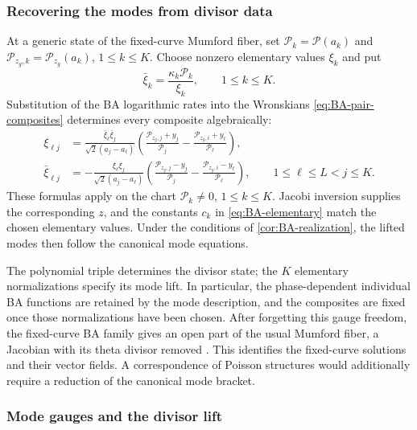 \subsubsection{Recovering the modes from divisor data}

At a generic state of the fixed-curve Mumford fiber, set
$\mathcal P_k=\mathcal P(a_k)$ and
$\mathcal P_{z_g,k}=\mathcal P_{z_g}(a_k)$,
$1\leq k\leq K$. Choose nonzero elementary values $\xi_k$ and put
\begin{equation}\label{eq:mumford-mode-inverse}
 \bar{\xi}_k=\frac{\kappa_k\mathcal P_k}{\xi_k},
 \qquad1\leq k\leq K.
\end{equation}
Substitution of the BA logarithmic rates into the Wronskians
\cref{eq:BA-pair-composites} determines every composite algebraically:
\begin{equation}\label{eq:mumford-composite-inverse}
\begin{aligned}
 \xi_{\ell j}
 &=\frac{\bar{\xi}_{\ell}\bar{\xi}_j}{\sqrt2(a_j-a_{\ell})}
       \left(\frac{\mathcal P_{z_g,j}+y_j}{\mathcal P_j}
             -\frac{\mathcal P_{z_g,i}+y_{\ell}}{\mathcal P_{\ell}}\right),\\
 \bar{\xi}_{\ell j}
 &=-\frac{\xi_{\ell}\xi_j}{\sqrt2(a_j-a_{\ell})}
       \left(\frac{\mathcal P_{z_g,j}-y_j}{\mathcal P_j}
             -\frac{\mathcal P_{z_g,i}-y_{\ell}}{\mathcal P_{\ell}}\right),
 \qquad1\leq\ell\leq L<j\leq K.
\end{aligned}
\end{equation}
These formulas apply on the chart $\mathcal P_k\ne0$,
$1\leq k\leq K$. Jacobi inversion supplies the corresponding
$z$, and the constants $c_k$ in \cref{eq:BA-elementary} match the
chosen elementary values. Under the conditions of
\cref{cor:BA-realization}, the lifted modes then follow the
canonical mode equations.

The polynomial triple determines the divisor state; the $K$
elementary normalizations specify its mode lift. In particular,
the phase-dependent individual BA functions are retained by the
mode description, and the composites are fixed once those
normalizations have been chosen. After forgetting this gauge
freedom, the fixed-curve BA family gives an open part of the usual
Mumford fiber, a Jacobian with its theta divisor removed
\cite[Proposition~3.1]{FernandesVanhaecke2001}. This identifies
the fixed-curve solutions and their vector fields. A correspondence
of Poisson structures would additionally require a reduction of
the canonical mode bracket.

\subsubsection{Mode gauges and the divisor lift}
\label{sec:mumford-gauge-lift}


